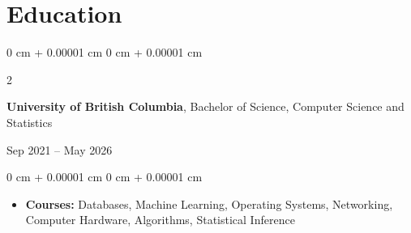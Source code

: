 \documentclass[9pt, letterpaper]{extarticle}
\newenvironment{highlights}{
    \begin{itemize}[
        topsep=0.10 cm,
        parsep=0.10 cm,
        partopsep=0pt,
        itemsep=0pt,
        leftmargin=0 cm + 10pt
    ]
}{
    \end{itemize}
} %
\newenvironment{onecolentry}{
    \begin{adjustwidth}{
        0 cm + 0.00001 cm
    }{
        0 cm + 0.00001 cm
    }
}{
    \end{adjustwidth}
} %
\newenvironment{twocolentry}[2][]{
    \onecolentry
    \def\secondColumn{#2}
    \setcolumnwidth{\fill, 4.5 cm}
    \begin{paracol}{2}
}{
    \switchcolumn \raggedleft \secondColumn
    \end{paracol}
    \endonecolentry
} %
\begin{document}
    \section{Education}
        \begin{twocolentry}{Sep 2021 – May 2026}
            \textbf{University of British Columbia}, Bachelor of Science, Computer Science and Statistics
        \end{twocolentry}
        \vspace{0.10 cm}
        \begin{onecolentry}
            \begin{highlights}
                \item \textbf{Courses:} Databases, Machine Learning, Operating Systems, Networking, Computer Hardware, Algorithms, Statistical Inference
            \end{highlights}
        \end{onecolentry}
\end{document}
